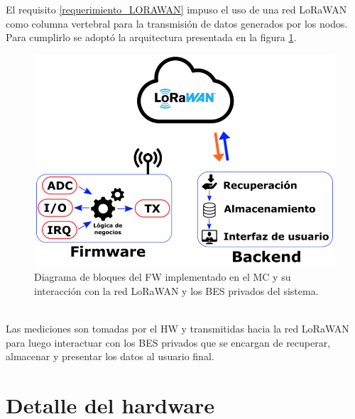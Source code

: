 El requisito \ref{requerimiento_LORAWAN} impuso el uso de una red LoRaWAN como columna vertebral para la transmisión de datos generados por los nodos. Para cumplirlo se adoptó la arquitectura presentada en la figura \ref{fig:diagramadebloquesdebes}.\\
\begin{figure}[h!]
	\centering
	\includegraphics[width=0.6\linewidth]{Figures/diagrama_de_bloques_de_BES}
	\caption{Diagrama de bloques del FW implementado en el MC y su interacción con la red LoRaWAN y los BES privados del sistema.}
	\label{fig:diagramadebloquesdebes}
\end{figure}\\
Las mediciones son tomadas por el HW y transmitidas hacia la red LoRaWAN para luego interactuar con los BES privados que se encargan de recuperar, almacenar y presentar los datos al usuario final.\\


\section{Detalle del hardware}
